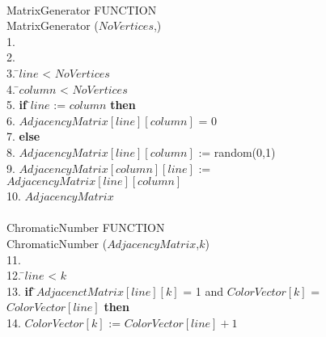 \documentclass{article}
\begin{document}
\begin{figure}
\begin{center}
\begin{tabbing}

\\MatrixGenerator FUNCTION\\
MatrixGenerator ($NoVertices$,) \\
1.\\
2. \\
3.  \=$line$ < $NoVertices$  \\
4. \indent  {} \=$column$ < $NoVertices$ \\
5. \indent  \>\> {\bf if} \=$line$ := $column$  {\bf then}\\
6. \indent \>\>\> $AdjacencyMatrix[line][column]$ = 0\\
7. \indent \>\> {\bf else} \\
8. \indent  \>\>\>  $AdjacencyMatrix[line][column]$ := random(0,1)\\
9. \indent                  \> $AdjacencyMatrix[column][line]$ := $AdjacencyMatrix[line][column]$\\
10.  $AdjacencyMatrix$\\

\\ChromaticNumber FUNCTION\\
ChromaticNumber ($AdjacencyMatrix$,$k$) \\
11. \\
12.  \=$line$ < $k$  \\
13. \indent  \>\> {\bf if} \=$AdjacenctMatrix[line][k]$ = 1 and $ColorVector[k]$ = $ColorVector[line]$  {\bf then}\\
14. \indent \>\>\> $ColorVector[k]$ := $ColorVector[line]+1$\\


\end{tabbing}
\end{center}
\end{figure}
\end{document}
